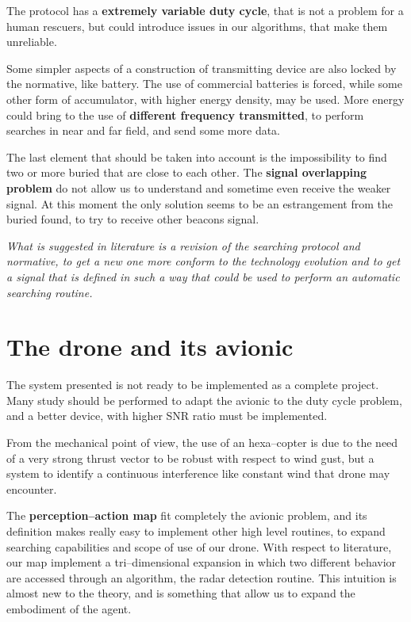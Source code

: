 The protocol has a \textbf{extremely variable duty cycle}, that is not a problem for a human rescuers, but could introduce issues in our algorithms, that make them unreliable.

Some simpler aspects of a construction of transmitting device are also locked by the normative, like battery. The use of commercial batteries is forced, while some other form of accumulator, with higher energy density, may be used. More energy could bring to the use of \textbf{different frequency transmitted}, to perform searches in near and far field, and send some more data.

The last element that should be taken into account is the impossibility to find two or more buried that are close to each other. The \textbf{signal overlapping problem} do not allow us to understand and sometime even receive the weaker signal. At this moment the only solution seems to be an estrangement from the buried found, to try to receive other beacons signal.

\textit{What is suggested in literature is a revision of the searching protocol and normative, to get a new one more conform to the technology evolution and to get a signal that is defined in such a way that could be used to perform an automatic searching routine.}

\section{The drone and its avionic}

The system presented is not ready to be implemented as a complete project. Many study should be performed to adapt the avionic to the duty cycle problem, and a better device, with higher SNR ratio must be implemented. 

From the mechanical point  of view, the use of an hexa--copter is due to the need of a very strong thrust vector to be robust with respect to wind gust, but a system to identify a continuous interference like constant wind that drone may encounter. 

The \textbf{perception--action map} fit completely the avionic problem, and its definition makes really easy to implement other high level routines, to expand searching capabilities and scope of use of our drone. With respect to literature, our map implement a tri--dimensional expansion in which two different behavior are accessed through an algorithm, the radar detection routine. This intuition is almost new to the theory, and is something that allow us to expand the embodiment of the agent.

